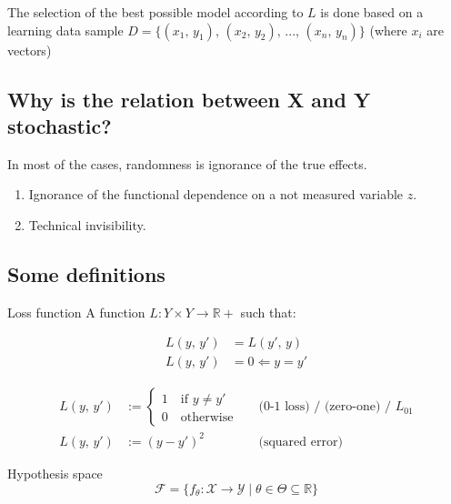 The selection of the best possible model according to \(L\) is done
based on a learning data sample
\(D = \bigl\{(x_1,\, y_1),\, (x_2,\, y_2),\, ...,\, (x_n,\, y_n)\bigr\}\) (where \(x_i\) are
vectors)

\subsection{Why is the relation between X and Y stochastic?}

In most of the cases, randomness is ignorance of the true effects.
\begin{enumerate}
	\item
	      Ignorance of the functional dependence on a not measured variable
	      \(z\).
	\item
	      Technical invisibility.
\end{enumerate}

\subsection{Some definitions}

\begin{definition}{Loss function}{}
	A function
	\(L: Y \times Y \longrightarrow \mathds{R}+\) such that:

	\begin{align*}
		L(y,\, y') & = L(y',\, y) \tag{symmetry} \\
		L(y,\, y') & = 0  \Longleftarrow y = y'
	\end{align*}

	\begin{align*}
		L(y,\, y') & := \begin{cases}1 \quad \text{if } y \neq y' \\ 0 \quad \text{otherwise} \end{cases} &  & \text{(0-1 loss) / (zero-one) / } L_{01} \\
		L(y,\, y') & := (y - y')^2                                                                        &  & \text{(squared error)}
	\end{align*}
\end{definition}

\begin{definition}{Hypothesis space}{}
	\begin{equation*}
		\mathcal{F} = \bigl\{f_\theta: \mathcal{X} \rightarrow \mathcal{Y} \mid \theta \in \varTheta \subseteq \mathds{R} \bigr\}
	\end{equation*}
\end{definition}


